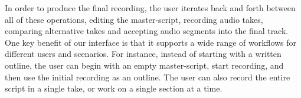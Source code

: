 
In order to produce the final recording, the user iterates back and forth between all of these operations, editing the master-script, recording audio takes, comparing alternative takes and accepting audio segments into the final track.
One key benefit of our interface is that it supports a wide range of workflows for different users and scenarios. For instance, instead of starting with a written outline, the user can begin with an empty master-script, start recording, and then use  the initial recording as an outline. The user can also record the entire script in a single take, or work on a single section at a time. 
